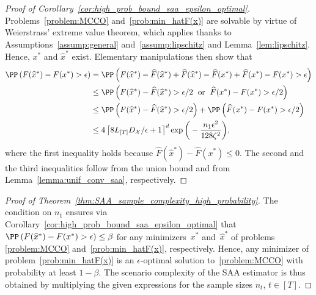 \documentclass[11pt]{article}
\let\hat\widehat
\begin{document}
\begin{proof}[Proof of Corollary~\ref{cor:high_prob_bound_saa_epsilon_optimal}] 
Problems~\eqref{problem:MCCO} and~\eqref{prob:min_hatF(x)} are solvable by virtue of Weierstrass' extreme value theorem, which applies thanks to Assumptions~\ref{assump:general} and~\ref{assump:lipschitz} and Lemma~\ref{lem:lipschitz}. Hence, $x^*$ and $\hat x^*$ exist. Elementary manipulations then show that
\begin{align*}
    \PP\left(   F(\hat{x}^*) - F(x^*)  > \epsilon \right) 
    &= \PP\left(   F(\hat{x}^*) - \hat{F}(\hat{x}^*) + \hat{F}(\hat{x}^*) - \hat{F}(x^*) + \hat{F}(x^*) - F(x^*)  > \epsilon \right) \\
    &\leq \PP\left( F(\hat{x}^*) - \hat{F}(\hat{x}^*) > \epsilon/2 \;\text{ or }\;  \hat{F}(x^*) - F(x^*)  > \epsilon/2 \right) \\
    &\leq   \PP\left( F(\hat{x}^*) - \hat{F}(\hat{x}^*) > \epsilon/2 \right) + \PP\left( \hat{F}(x^*) - F(x^*)  > \epsilon/2 \right)   \\
    &\leq 4\left\lceil 8L_{[T]} D_\mathcal{X}/\epsilon +1\right\rceil^{d} \exp\bigg(- \frac{n_1\epsilon^2}{128\zeta^2} \bigg),
\end{align*}
where the first inequality holds because $\hat{F}(\hat{x}^*) - \hat{F}(x^*) \leq 0$. The second and the third inequalities follow from the union bound and from Lemma~\ref{lemma:unif_conv_saa}, respectively.
\end{proof}


\begin{proof}[Proof of Theorem~\ref{thm:SAA_sample_complexity_high_probability}]
    The condition on $n_1$ ensures via Corollary~\ref{cor:high_prob_bound_saa_epsilon_optimal} that $ \PP\left( F(\hat{x}^*) - F(x^*)  > \epsilon \right) \leq \beta$ for any minimizers~$x^*$ and~$\hat{x}^*$ of problems \eqref{problem:MCCO} and~\eqref{prob:min_hatF(x)}, respectively. Hence, any minimizer of problem~\eqref{prob:min_hatF(x)} is an $\epsilon$-optimal solution to~\eqref{problem:MCCO} with probability at least $1-\beta$. The scenario complexity of the SAA estimator is thus obtained by multiplying the given expressions for the sample sizes $n_t$, $t\in[T]$.
\end{proof}

\end{document}
